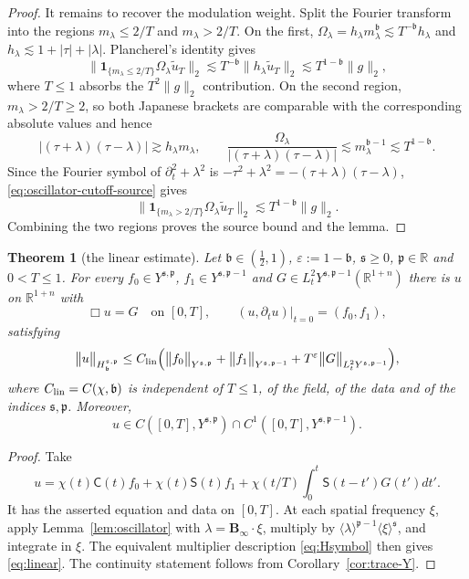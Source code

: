 \documentclass[11pt,reqno]{amsart}
\theoremstyle{plain}
\newtheorem{theorem}{Theorem}[section]
\theoremstyle{definition}
\theoremstyle{remark}
\numberwithin{equation}{section}
\newcommand{\breg}{\mathfrak b}
\newcommand{\sreg}{\mathfrak s}
\newcommand{\preg}{\mathfrak p}
\newcommand{\Binf}{\mathbf B_\infty}
\newcommand{\Cprop}{\mathsf C}
\newcommand{\Sprop}{\mathsf S}
\newcommand{\Real}{\mathbb R}
\newcommand{\Rst}{\Real^{1+n}}
\begin{document}
\begin{proof}
It remains to recover the modulation weight.  Split the Fourier transform
into the regions $m_\lambda\le2/T$ and $m_\lambda>2/T$.  On the first,
$\Omega_\lambda=h_\lambda m_\lambda^{\breg}\lesssim
T^{-\breg}h_\lambda$ and
$h_\lambda\lesssim1+|\tau|+|\lambda|$.  Plancherel's identity gives
\[
 \|\mathbf 1_{\{m_\lambda\le2/T\}}
       \Omega_\lambda\widetilde u_T\|_2
 \lesssim T^{-\breg}\|h_\lambda\widetilde u_T\|_2
 \lesssim T^{1-\breg}\|g\|_2,
\]
where $T\le1$ absorbs the $T^2\|g\|_2$ contribution.  On the second
region, $m_\lambda>2/T\ge2$, so both Japanese brackets are comparable
with the corresponding absolute values and hence
\[
 |(\tau+\lambda)(\tau-\lambda)|\gtrsim h_\lambda m_\lambda,\qquad
 \frac{\Omega_\lambda}{|(\tau+\lambda)(\tau-\lambda)|}
 \lesssim m_\lambda^{\breg-1}\lesssim T^{1-\breg}.
\]
Since the Fourier symbol of $\partial_t^2+\lambda^2$ is
$-\tau^2+\lambda^2=-(\tau+\lambda)(\tau-\lambda)$,
\eqref{eq:oscillator-cutoff-source} gives
\[
 \|\mathbf 1_{\{m_\lambda>2/T\}}
       \Omega_\lambda\widetilde u_T\|_2
 \lesssim T^{1-\breg}\|g\|_2.
\]
Combining the two regions proves the source bound and the lemma.
\end{proof}

\begin{theorem}[the linear estimate]\label{thm:linear}
Let $\breg\in(\frac12,1)$, $\varepsilon:=1-\breg$,
$\sreg\ge0$, $\preg\in\Real$ and $0<T\le1$. For every
$f_0\in Y^{\sreg,\preg}$,
$f_1\in Y^{\sreg,\preg-1}$ and
$G\in L^{2}_tY^{\sreg,\preg-1}(\Rst)$ there is
$u$ on $\Rst$ with
\[
 \Box u=G\quad\text{on }[0,T],\qquad
 (u,\partial_tu)|_{t=0}=(f_0,f_1),
\]
satisfying
\begin{equation}\label{eq:linear}
\big\|u\big\|_{H^{\sreg,\preg}_{\breg}}
 \le C_{\rm lin}\Big(
 \big\|f_0\big\|_{Y^{\sreg,\preg}}
 +\big\|f_1\big\|_{Y^{\sreg,\preg-1}}
 +T^{\varepsilon}\big\|G\big\|_{L^{2}_tY^{\sreg,\preg-1}}\Big),
\end{equation}
where $C_{\rm lin}=C(\chi,\breg)$ is independent of $T\le1$, of the
field, of the data and of the indices $\sreg,\preg$. Moreover,
\[
 u\in C([0,T],Y^{\sreg,\preg})
 \cap C^1([0,T],Y^{\sreg,\preg-1}).
\]
\end{theorem}

\begin{proof}
Take
\[
 u=\chi(t)\Cprop(t)f_0+\chi(t)\Sprop(t)f_1
   +\chi(t/T)\int_0^t\Sprop(t-t')G(t') dt'.
\]
It has the asserted equation and data on $[0,T]$.  At each spatial frequency
$\xi$, apply Lemma~\ref{lem:oscillator} with
$\lambda=\Binf\cdot\xi$, multiply by
$\langle\lambda\rangle^{\preg-1}\langle\xi\rangle^{\sreg}$, and
integrate in $\xi$.  The equivalent multiplier description \eqref{eq:Hsymbol}
then gives \eqref{eq:linear}.  The continuity statement follows from
Corollary~\ref{cor:trace-Y}.
\end{proof}
\end{document}
